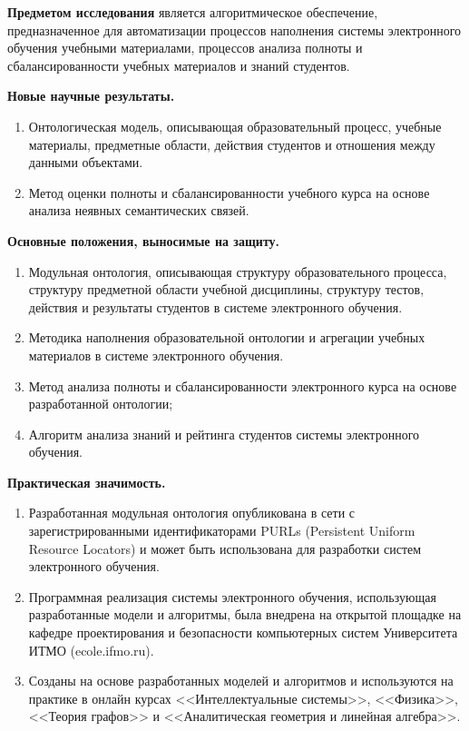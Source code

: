 \textbf{Предметом исследования} является алгоритмическое обеспечение, предназначенное для автоматизации процессов наполнения системы электронного обучения учебными материалами, процессов анализа полноты и сбалансированности учебных материалов и знаний студентов. 

\textbf{Новые научные результаты.}
\begin{enumerate}
 \item Онтологическая модель, описывающая образовательный процесс, учебные материалы, предметные области, действия студентов и отношения между данными объектами. 
 \item Метод оценки полноты и сбалансированности учебного курса на основе анализа неявных семантических связей.
\end{enumerate}

\textbf{Основные положения, выносимые на защиту.}
\begin{enumerate}
 \item Модульная онтология, описывающая структуру образовательного процесса, структуру предметной области учебной дисциплины, структуру тестов, действия и результаты студентов в системе электронного обучения.
 \item Методика наполнения образовательной онтологии и агрегации учебных материалов в системе электронного обучения.
 \item Метод анализа полноты и сбалансированности электронного курса на основе разработанной онтологии;
 \item Алгоритм анализа знаний и рейтинга студентов системы электронного обучения.
 \end{enumerate}


\textbf{Практическая значимость.}
\begin{enumerate}
 \item Разработанная модульная онтология опубликована в сети с зарегистрированными идентификаторами PURLs (Persistent Uniform Resource Locators) и может быть использована для разработки систем электронного обучения.
 \item Программная реализация системы электронного обучения, использующая разработанные модели и алгоритмы, была внедрена на открытой площадке на кафедре проектирования и безопасности компьютерных систем Университета ИТМО (ecole.ifmo.ru). 
 \item Созданы на основе разработанных моделей и алгоритмов и используются на практике в онлайн курсах 
<<Интеллектуальные системы>>, <<Физика>>, <<Теория графов>> и <<Аналитическая геометрия и линейная алгебра>>.
 \end{enumerate}
 
